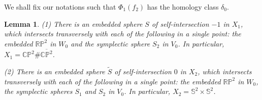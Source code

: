 \documentclass[11pt]{amsart}
\theoremstyle{plain}
\numberwithin{theorem}{section}
\newtheorem{lemma}[theorem]{Lemma}
\theoremstyle{definition}
\newcommand{\C}{{\mathbb C}}
\newcommand{\R}{{\mathbb R}}
\renewcommand{\P}{{\mathbb P}}
\newcommand{\s}{{\mathbb S}}
\begin{document}
We shall fix our notations such that  $\Phi_1(f_2)$ has the homology class $\delta_0$.

\begin{lemma}
{\em(}1{\em)} There is an embedded sphere $S$ of self-intersection $-1$ in $X_1$, which intersects 
transversely with each of the following in a single point: the embedded $\R\P^2$ in $W_0$ and the symplectic sphere $S_2$ in $V_0$. In particular, $X_1=\C\P^2\# \overline{\C\P^2}$. 

{\em(}2{\em)} There is an embedded sphere $\tilde{S}$ of self-intersection $0$ in $X_2$, which intersects 
transversely with each of the following in a single point: the embedded $\R\P^2$ in $W_0$, the symplectic spheres $S_1$ and $S_2$ in $V_0$. In particular, $X_2=\s^2\times \s^2$. 
\end{lemma}
\end{document}
